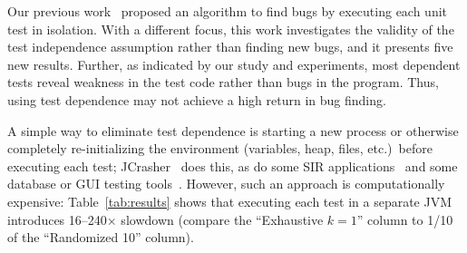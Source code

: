 Our previous work~\cite{DBLP:conf/sigsoft/MusluSW11} proposed
an algorithm to find bugs by executing each unit
test in isolation. With a different focus,
this work investigates the validity of the test independence assumption
rather than finding new bugs,
and it presents five new results.
Further, as indicated by our study and experiments, most dependent
tests reveal weakness in the test code rather than bugs in the program. Thus,
using test dependence may not achieve a high return in bug finding.

A simple way to eliminate test dependence is
starting a new process or otherwise completely re-initializing the environment (variables,
heap, files, etc.)\ before executing each test;
JCrasher~\cite{Csallner:2004} does this, as do
some SIR applications~\cite{sir} and
some database or GUI testing tools~\cite{kapfhammeretal:FSE:2003,
Chays:2000:FTD:347324.348954, Gray:1994:QGB:191843.191886
}.
However, such an approach is computationally expensive:
Table~\ref{tab:results} shows that executing each test in a
separate JVM introduces 16--240$\times$ slowdown (compare the 
``Exhaustive $k=1$'' column to 1/10 of the ``Randomized 10'' column).





